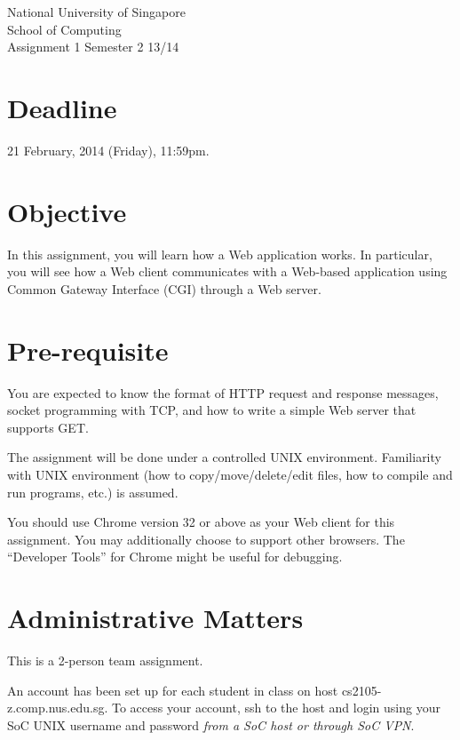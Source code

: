 \documentclass[a4paper,11pt]{exam}
\begin{document}
    \extraheadheight{.5in}
    {\large\sf National University of Singapore\\ School of Computing \\
    \LARGE\sf Assignment 1}%
    {\large\sf Semester 2 13/14}
    \firstpageheadrule
    \pagestyle{headandfoot}

    \section*{Deadline}

    21 February, 2014 (Friday), 11:59pm.

    \section*{Objective}

    In this assignment, you will learn how a Web application works. In particular, you will see how a Web client communicates with a Web-based application using Common Gateway Interface (CGI) through a Web server.

    \section*{Pre-requisite}

You are expected to know the format of HTTP request and response messages, socket programming with TCP, and how to write a simple Web server that supports GET. 

    The assignment will be done under a controlled UNIX environment. Familiarity with UNIX environment (how to copy/move/delete/edit files, how to compile and run programs, etc.) is assumed.

    You should use Chrome version 32 or above as your Web client for this assignment.  You may additionally choose to support other browsers.  The ``Developer Tools'' for Chrome might be useful for debugging.

    \section*{Administrative Matters}

This is a 2-person team assignment.  

An account has been set up for each student in class on host cs2105-z.comp.nus.edu.sg. To access your account, ssh to the host and login using your SoC UNIX username and password \textit{from a SoC host or through SoC VPN}.
\end{document}
